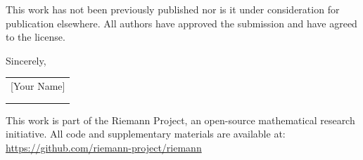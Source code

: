 \documentclass[12pt]{article}
\begin{document}
This work has not been previously published nor is it under consideration for publication elsewhere. All authors have approved the submission and have agreed to the \arXiv license.

\vspace{1cm}
\noindent
Sincerely,

\vspace{1cm}

{\iefmode\small\else\large\fi
\begin{tabular}{l}
  [Your Name] \\
  [Your Affiliation] \\
  [Your Email] \\
  [Your ORCID]
\end{tabular}
}


\vspace{1cm}
\noindent
{\footnotesize This work is part of the Riemann Project, an open-source mathematical research initiative. All code and supplementary materials are available at: \url{https://github.com/riemann-project/riemann}}
\end{document}
